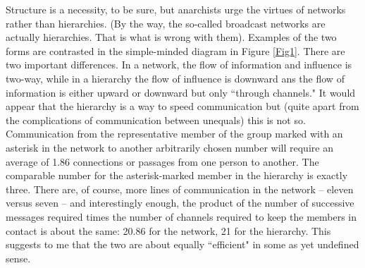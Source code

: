 Structure is a necessity, to be sure, but anarchists urge the virtues of networks rather than hierarchies. (By the way, the so-called broadcast networks are actually hierarchies. That is what is wrong with them). Examples of the two forms are contrasted in the simple-minded diagram in Figure \ref{Fig1}. There are two important differences. In a network, the flow of information and influence is two-way, while in a hierarchy the flow of influence is downward ans the flow of information is either upward or downward but only ``through channels." It would appear that the hierarchy is a way to speed communication but (quite apart from the complications of communication between unequals) this is not so. Communication from the representative member of the group marked with an asterisk in the network to another arbitrarily chosen number will require an average of 1.86 connections or passages from one person to another. The comparable number for the asterisk-marked member in the hierarchy is exactly three. There are, of course, more lines of communication in the network -- eleven versus seven -- and interestingly enough, the product of the number of successive messages required times the number of channels required to keep the members in contact is about the same: 20.86 for the network, 21 for the hierarchy. This suggests to me that the two are about equally ``efficient" in some as yet undefined sense.\\
